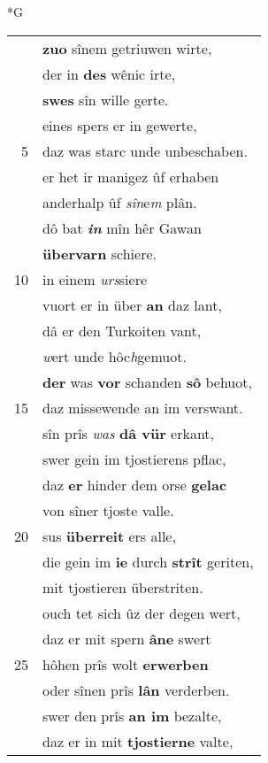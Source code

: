 \documentclass[8pt,a4paper,notitlepage]{article}
\begin{document}
\begin{table}[ht]
\begin{minipage}[t]{0.5\linewidth}
\small
\begin{center}*G
\end{center}
\begin{tabular}{rl}
 & \textbf{zuo} sînem getriuwen wirte,\\ 
 & der in \textbf{des} wênic irte,\\ 
 & \textbf{swes} sîn wille gerte.\\ 
 & eines spers er in gewerte,\\ 
5 & daz was starc unde unbeschaben.\\ 
 & er het ir manigez ûf erhaben\\ 
 & anderhalp ûf \textit{sîn}e\textit{m} plân.\\ 
 & dô bat \textit{\textbf{in}} mîn hêr Gawan\\ 
 & \textbf{übervarn} schiere.\\ 
10 & in einem \textit{urs}siere\\ 
 & vuort er in über \textbf{an} daz lant,\\ 
 & dâ er den Turkoiten vant,\\ 
 & \textit{w}ert unde hôc\textit{h}gemuot.\\ 
 & \textbf{der} was \textbf{vor} schanden \textbf{sô} behuot,\\ 
15 & daz missewende an im verswant.\\ 
 & sîn prîs \textit{was} \textbf{dâ vür} erkant,\\ 
 & swer gein im tjostierens pflac,\\ 
 & daz \textbf{er} hinder dem orse \textbf{gelac}\\ 
 & von sîner tjoste valle.\\ 
20 & sus \textbf{überreit} ers alle,\\ 
 & die gein im \textbf{ie} durch \textbf{strît} geriten,\\ 
 & mit tjostieren überstriten.\\ 
 & ouch tet sich ûz der degen wert,\\ 
 & daz er mit spern \textbf{âne} swert\\ 
25 & hôhen prîs wolt \textbf{erwerben}\\ 
 & oder sînen prîs \textbf{lân} verderben.\\ 
 & swer den prîs \textbf{an im} bezalte,\\ 
 & daz er in mit \textbf{tjostierne} valte,\\ 

\end{tabular}
\end{minipage}
\end{table}
\end{document}
